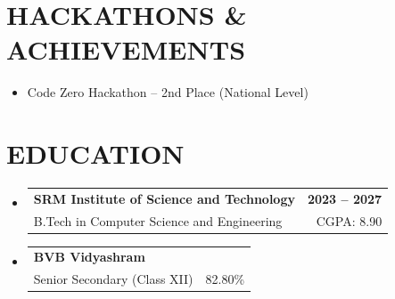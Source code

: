 \documentclass[11pt,letterpaper]{article}
\makeatletter
\newcommand{\resumeSubheading}[4]{
  \vspace{-2pt}
  \item
    \begin{tabular*}{0.97\textwidth}[t]{l@{\extracolsep{\fill}}r}
      \textbf{#1} & \textbf{#2} \\
      #3 & #4 \\
    \end{tabular*}\vspace{-5pt}
}
\makeatother
\begin{document}
\section{HACKATHONS \& ACHIEVEMENTS}
\begin{itemize}[leftmargin=*]
\item Code Zero Hackathon -- 2nd Place (National Level)
\end{itemize}

\section{EDUCATION}
\begin{itemize}[leftmargin=*]
\resumeSubheading
{SRM Institute of Science and Technology}{2023 -- 2027}
{B.Tech in Computer Science and Engineering}{CGPA: 8.90}
\resumeSubheading
{BVB Vidyashram}{}
{Senior Secondary (Class XII)}{82.80\%}
\end{itemize}
\end{document}

